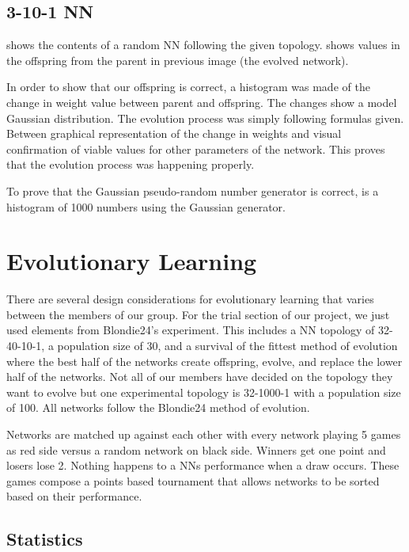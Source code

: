 \documentclass{article}
\begin{document}
\subsection{3-10-1 NN}

 shows the contents of a random
NN following the given topology.  shows values in the offspring from the
parent in previous image (the evolved network).

In order to show that our offspring is correct, a
histogram was made of the change in weight value between parent and offspring. The
changes show a model Gaussian distribution. The evolution process was simply following formulas
given. Between graphical representation of the change in weights and visual
confirmation of viable values for other parameters of the network. This proves that
the evolution process was happening properly.

To prove that the Gaussian pseudo-random number generator is correct, 
is a histogram of 1000 numbers using the Gaussian generator.

\section{Evolutionary Learning}

There are several design considerations for evolutionary
learning that varies between the members of our group. For the trial section of
our project, we just used elements from Blondie24’s experiment. This includes a
NN topology of 32-40-10-1, a population size of 30, and a survival of the
fittest method of evolution where the best half of the networks create
offspring, evolve, and replace the lower half of the networks. Not all of our
members have decided on the topology they want to evolve but one experimental
topology is 32-1000-1 with a population size of 100. All networks follow the
Blondie24 method of evolution.

Networks are matched up against each other with
every network playing 5 games as red side versus a random network on black
side. Winners get one point and losers lose 2. Nothing happens to a NNs
performance when a draw occurs. These games compose a points based tournament
that allows networks to be sorted based on their performance.

\subsection{Statistics}
\end{document}
